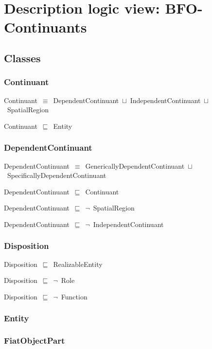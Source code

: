 \documentclass{article}
\begin{document}
\section*{Description logic view: BFO-Continuants}
\subsection*{Classes}

\subsubsection*{Continuant}

Continuant~\ensuremath{\equiv}~DependentContinuant~\ensuremath{\sqcup}~IndependentContinuant~\ensuremath{\sqcup}~SpatialRegion

Continuant~\ensuremath{\sqsubseteq}~Entity~

\subsubsection*{DependentContinuant}

DependentContinuant~\ensuremath{\equiv}~GenericallyDependentContinuant~\ensuremath{\sqcup}~SpecificallyDependentContinuant

DependentContinuant~\ensuremath{\sqsubseteq}~Continuant~

DependentContinuant~\ensuremath{\sqsubseteq}~\ensuremath{\lnot}~SpatialRegion

DependentContinuant~\ensuremath{\sqsubseteq}~\ensuremath{\lnot}~IndependentContinuant

\subsubsection*{Disposition}

Disposition~\ensuremath{\sqsubseteq}~RealizableEntity~

Disposition~\ensuremath{\sqsubseteq}~\ensuremath{\lnot}~Role

Disposition~\ensuremath{\sqsubseteq}~\ensuremath{\lnot}~Function

\subsubsection*{Entity}

\subsubsection*{FiatObjectPart}
\end{document}
